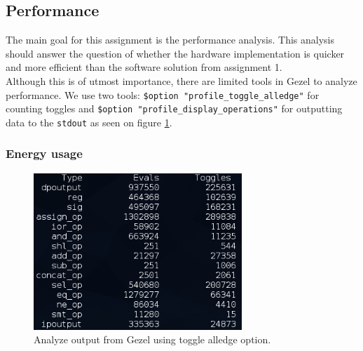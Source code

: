 \subsection{Performance}
\label{sec:performance}

The main goal for this assignment is the performance analysis. This analysis should  answer the question of whether the hardware implementation is quicker and more efficient than the software solution from assignment 1. \\

Although this is of utmost importance, there are limited tools in Gezel to analyze performance. We use two tools: \texttt{\$option "profile\_toggle\_alledge"} for counting toggles and \texttt{\$option "profile\_display\_operations"} for outputting data to the \texttt{stdout} as seen on figure \ref{fig:toggles}.

\subsubsection{Energy usage}
\label{sec:energyUsage}

\begin{figure}[H]
    \centering
    \includegraphics[width=0.7\textwidth]{3Results/fig/Toggles.png}
    \caption{Analyze output from Gezel using toggle alledge option.}
    \label{fig:toggles}
\end{figure}

